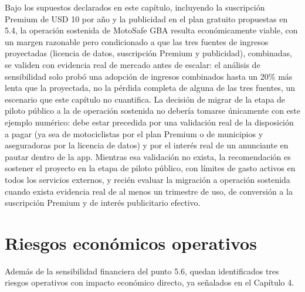 Bajo los supuestos declarados en este capítulo, incluyendo la
suscripción Premium de USD 10 por año y la publicidad en el plan
gratuito propuestas en 5.4, la operación sostenida de MotoSafe GBA
resulta económicamente viable, con un margen razonable pero condicionado
a que las tres fuentes de ingresos proyectadas (licencia de datos,
suscripción Premium y publicidad), combinadas, se validen con evidencia
real de mercado antes de escalar: el análisis de sensibilidad solo probó
una adopción de ingresos combinados hasta un 20\% más lenta que la
proyectada, no la pérdida completa de alguna de las tres fuentes, un
escenario que este capítulo no cuantifica. La decisión de migrar de la
etapa de piloto público a la de operación sostenida no debería tomarse
únicamente con este ejemplo numérico: debe estar precedida por una
validación real de la disposición a pagar (ya sea de motociclistas por
el plan Premium o de municipios y aseguradoras por la licencia de datos)
y por el interés real de un anunciante en pautar dentro de la app.
Mientras esa validación no exista, la recomendación es sostener el
proyecto en la etapa de piloto público, con límites de gasto activos en
todos los servicios externos, y recién evaluar la migración a operación
sostenida cuando exista evidencia real de al menos un trimestre de uso,
de conversión a la suscripción Premium y de interés publicitario
efectivo.

\section{Riesgos económicos operativos}

Además de la sensibilidad financiera del punto 5.6, quedan identificados
tres riesgos operativos con impacto económico directo, ya señalados en
el Capítulo 4.

